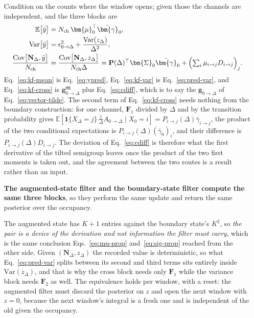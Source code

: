 \begin{appendixbox}
Condition on the counts where the window opens; given those the channels are independent, and the
three blocks are
\begin{align}
  \mathbb{E}\bigl[\bar y\bigr] &= N_{\mathrm{ch}}\,\bm{\mu}_0^\top\bar{\bm{\gamma}}_0,
  \label{eq:kf-mean}\\
  \mathrm{Var}\bigl[\bar y\bigr] &= \epsilon^2_{0\to\Delta} + \frac{\mathrm{Var}(z_\Delta)}{\Delta^2},
  \label{eq:kf-var}\\
  \frac{\mathrm{Cov}\bigl[\mathbf{N}_\Delta,\bar y\bigr]}{N_{\mathrm{ch}}}
    &= \frac{\mathrm{Cov}\bigl[\mathbf{N}_\Delta,z_\Delta\bigr]}{N_{\mathrm{ch}}\Delta}
    = \mathbf{P}(\Delta)^\top\bm{\Sigma}_0\bar{\bm{\gamma}}_0
      + \Bigl(\textstyle\sum_{i}\mu_{i\to j}D_{i\to j}\Bigr)_{j} .
  \label{eq:kf-cross}
\end{align}
Eq.~\ref{eq:kf-mean} is Eq.~\ref{eq:ypred}, Eq.~\ref{eq:kf-var} is Eq.~\ref{eq:pred-var}, and
Eq.~\ref{eq:kf-cross} is $\mathbf{g}^{\mathtt{MR}}_{0\to\Delta}$ plus Eq.~\ref{eq:cdiff}, which is to say the
$\mathbf{g}_{0\to\Delta}$ of Eq.~\ref{eq:vector-tilde}. The second term of Eq.~\ref{eq:kf-cross} needs nothing
from the boundary construction: for one channel, $\mathbf{F}_1$ divided by $\Delta$ and by the
transition probability gives
$\mathbb{E}[\mathbf{1}\{X_\Delta=j\}\,\tfrac{1}{\Delta}A_{0\to\Delta}\mid X_0=i]
= P_{i\to j}(\Delta)\bar{\gamma}_{i\to j}$, the product of the two conditional
expectations is $P_{i\to j}(\Delta)(\bar\gamma_0)_{i}$, and their difference is
$P_{i\to j}(\Delta)D_{i\to j}$. The deviation of Eq.~\ref{eq:cdiff} is therefore what the
first derivative of the tilted semigroup leaves once the product of the two first moments is taken
out, and the agreement between the two routes is a result rather than an input.

\textbf{The augmented-state filter and the boundary-state filter compute the same three blocks},
so they perform the same update and return the same posterior over the occupancy.

The augmented state has $K+1$ entries against the boundary state's $K^2$, so \emph{the pair is a
device of the derivation and not information the filter must carry}, which is the same conclusion
Eqs.~\ref{eq:mu-prop} and~\ref{eq:sig-prop} reached from the other side. Given
$(\mathbf{N}_\Delta, z_\Delta)$ the recorded value is deterministic, so what
Eq.~\ref{eq:pred-var} splits between its second and third terms sits entirely inside
$\mathrm{Var}(z_\Delta)$, and that is why the cross block needs only $\mathbf{F}_1$ while the
variance block needs $\mathbf{F}_2$ as well. The equivalence holds per window, with a reset: the
augmented filter must discard the posterior on $z$ and open the next window with $z=0$, because
the next window's integral is a fresh one and is independent of the old given the occupancy.


\end{appendixbox}
